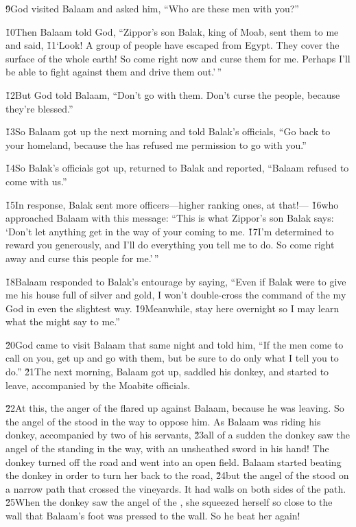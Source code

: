 \v{9}God visited Balaam and asked him, ``Who are these men with you?''

\v{10}Then Balaam told God, ``Zippor's son Balak, king of Moab, sent them to me and said, \v{11}`Look! A group of people have escaped from Egypt. They cover the surface of the whole earth! So come right now and curse them for me. Perhaps I'll be able to fight against them and drive them out.'\,''

\v{12}But God told Balaam, ``Don't go with them. Don't curse the people, because they're blessed.''

\v{13}So Balaam got up the next morning and told Balak's officials, ``Go back to your homeland, because the  has refused me permission to go with you.''

\v{14}So Balak's officials got up, returned to Balak and reported, ``Balaam refused to come with us.''

\v{15}In response, Balak sent more officers---higher ranking ones, at that!--- \v{16}who approached Balaam with this message: ``This is what Zippor's son Balak says: `Don't let anything get in the way of your coming to me. \v{17}I'm determined to reward you generously, and I'll do everything you tell me to do. So come right away and curse this people for me.'\,''

\v{18}Balaam responded to Balak's entourage by saying, ``Even if Balak were to give me his house full of silver and gold, I won't double-cross the command of the  my God in even the slightest way. \v{19}Meanwhile, stay here overnight so I may learn what the  might say to me.''

\v{20}God came to visit Balaam that same night and told him, ``If the men come to call on you, get up and go with them, but be sure to do only what I tell you to do.'' \v{21}The next morning, Balaam got up, saddled his donkey, and started to leave, accompanied by the Moabite officials.

\v{22}At this, the anger of the  flared up against Balaam, because he was leaving. So the angel of the  stood in the way to oppose him. As Balaam was riding his donkey, accompanied by two of his servants, \v{23}all of a sudden the donkey saw the angel of the  standing in the way, with an unsheathed sword in his hand! The donkey turned off the road and went into an open field. Balaam started beating the donkey in order to turn her back to the road, \v{24}but the angel of the  stood on a narrow path that crossed the vineyards. It had walls on both sides of the path. \v{25}When the donkey saw the angel of the , she squeezed herself so close to the wall that Balaam's foot was pressed to the wall. So he beat her again!

